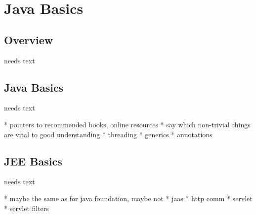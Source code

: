 \documentclass[a4paper,10pt,twoside]{book}
\begin{document}
  \sloppy
\fi


\chapter{Java Basics}

\section{Overview}
needs text

\section{Java Basics}
needs text

  * pointers to recommended books, online resources
  * say which non-trivial things are vital to good understanding
  * threading
  * generics
  * annotations

\section{JEE Basics}
needs text

  * maybe the same as for java foundation, maybe not
  * jaas
  * http comm
  * servlet
  * servlet filters


\ifx\wholebook\relax\else
   
   
\end{document}
